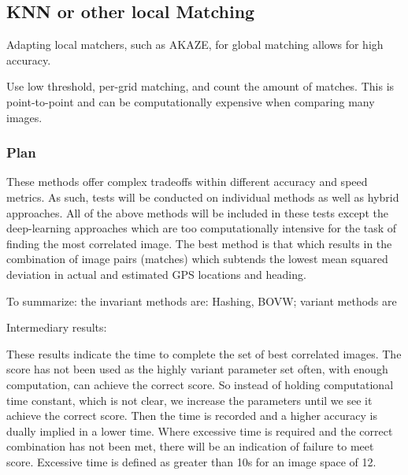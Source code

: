 \subsection*{KNN or other local Matching}  
Adapting local matchers, such as AKAZE, for global matching allows for high accuracy. 

Use low threshold, per-grid matching, and count the amount of matches. This is point-to-point and can be computationally expensive when comparing many images. 



\subsubsection*{Plan}
These methods offer complex tradeoffs within different accuracy and speed metrics. As such, tests will be conducted on individual methods as well as hybrid approaches. All of the above methods will be included in these tests except the deep-learning approaches which are too computationally intensive for the task of finding the most correlated image. The best method is that which results in the combination of image pairs (matches) which subtends the lowest mean squared deviation in actual and estimated GPS locations and heading. 


To summarize: the invariant methods are: Hashing, BOVW; variant methods are 



Intermediary results:

These results indicate the time to complete the set of best correlated images. The score has not been used as the highly variant parameter set often, with enough computation, can achieve the correct score. So instead of holding computational time constant, which is not clear, we increase the parameters until we see it achieve the correct score. Then the time is recorded and a higher accuracy is dually implied in a lower time. Where excessive time is required and the correct combination has not been met, there will be an indication of failure to meet score. 
Excessive time is defined as greater than 10s for an image space of 12. 

